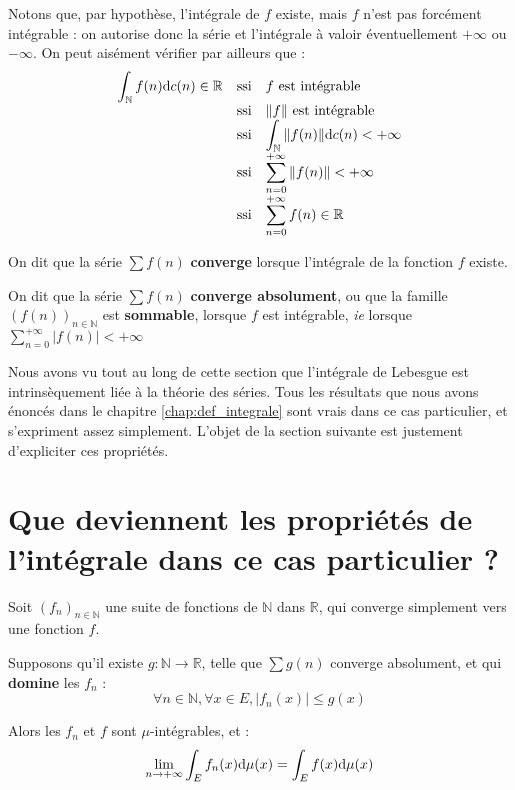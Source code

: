 \documentclass[../integ-proba.tex]{subfiles}
\begin{document}
\begin{rem}
    Notons que, par hypothèse, l'intégrale de $f$ existe, mais $f$ n'est pas forcément intégrable : on autorise donc la série et l'intégrale à valoir éventuellement $+\infty$ ou $-\infty$.
    On peut aisément vérifier par ailleurs que :
    $$
    {
    \everymath={\displaystyle}
    \begin{array}{rcl}
        \int_\mathbb{N} f(n) \text{d} c(n) \in \mathbb{R} & \text{ssi} & f \text{ est intégrable } \\
                                                          & \text{ssi} & \|f\| \text{ est intégrable} \\
                                                          & \text{ssi} & \int_\mathbb{N} \|f(n)\| \text{d} c(n) < + \infty \\
                                                          & \text{ssi} & \sum_{n=0}^{+ \infty} \|f(n)\| < + \infty \\
                                                          & \text{ssi} & \sum_{n=0}^{+ \infty} f(n) \in \mathbb{R}
    \end{array}
    }
    $$
\end{rem}

\begin{defi}
    On dit que la série $\sum f(n)$ \textbf{converge} lorsque l'intégrale de la fonction $f$ existe.

    On dit que la série $\sum f(n)$ \textbf{converge absolument}, ou que la famille $\left(f(n)\right)_{n \in \mathbb{N}}$ est \textbf{sommable}, lorsque $f$ est intégrable, \textit{ie} lorsque $\sum_{n=0}^{+ \infty} \left|f(n)\right| < + \infty$
\end{defi}

Nous avons vu tout au long de cette section que l'intégrale de Lebesgue est intrinsèquement liée à la théorie des séries.
Tous les résultats que nous avons énoncés dans le chapitre \ref{chap:def_integrale} sont vrais dans ce cas particulier, et s'expriment assez simplement.
L'objet de la section suivante est justement d'expliciter ces propriétés.

\section{Que deviennent les propriétés de l'intégrale dans ce cas particulier ?}

\begin{thm}
  Soit $\left(f_n\right)_{n \in \mathbb{N}}$ une suite de fonctions de $\mathbb{N}$ dans $\mathbb{R}$, qui converge simplement vers une fonction $f$.

  Supposons qu'il existe $g:\mathbb{N} \longrightarrow \mathbb{R}$, telle que $\sum g(n)$ converge absolument, et qui \textbf{domine} les $f_n$ :
  $$
  \forall n \in \mathbb{N}, \forall x \in E, \left|f_n(x)\right| \leq g(x)
  $$

  Alors les $f_n$ et $f$ sont $\mu$-intégrables, et :
  $$
  \lim_{n \to + \infty} \int_E f_n(x) \textnormal{d}\mu(x) = \int_E f(x) \textnormal{d}\mu(x)
  $$
\end{thm}
\end{document}
